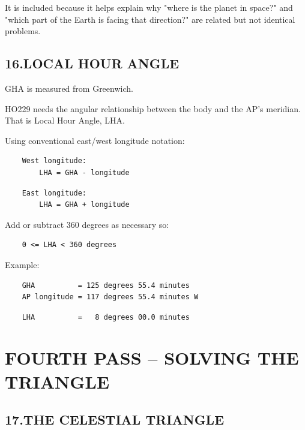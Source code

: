 \documentclass[11pt]{article}
\begin{document}
It is included because it helps explain why "where is the planet in space?" and "which part of the Earth is facing that direction?" are related but not identical problems.

\subsection*{16.\quad LOCAL HOUR ANGLE}

GHA is measured from Greenwich.

HO229 needs the angular relationship between the body and the AP's meridian. That is Local Hour Angle, LHA.

Using conventional east/west longitude notation:

\begin{verbatim}
    West longitude:
        LHA = GHA - longitude
\end{verbatim}

\begin{verbatim}
    East longitude:
        LHA = GHA + longitude
\end{verbatim}

Add or subtract 360 degrees as necessary so:

\begin{verbatim}
    0 <= LHA < 360 degrees
\end{verbatim}

Example:

\begin{verbatim}
    GHA          = 125 degrees 55.4 minutes
    AP longitude = 117 degrees 55.4 minutes W
\end{verbatim}

\begin{verbatim}
    LHA          =   8 degrees 00.0 minutes
\end{verbatim}

\section*{FOURTH PASS -- SOLVING THE TRIANGLE}

\subsection*{17.\quad THE CELESTIAL TRIANGLE}
\end{document}
